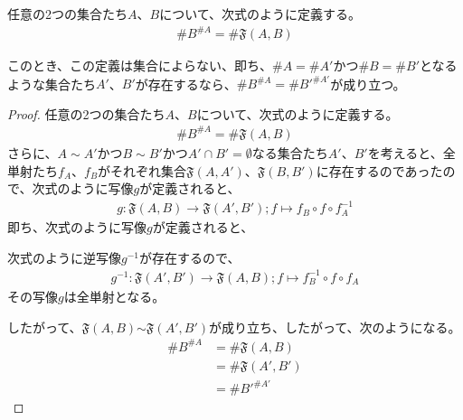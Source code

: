 \documentclass[dvipdfmx]{jsarticle}
\begin{document}
\begin{dfn}
任意の2つの集合たち$A$、$B$について、次式のように定義する。
\begin{align*}
{\# B}^{\# A} = \# {\mathfrak{F}(A,B)}
\end{align*}
\end{dfn}
\begin{thm}\label{1.2.8.7}
このとき、この定義は集合によらない、即ち、$\# A = \# A'$かつ$\# B = \# B'$となるような集合たち$A'$、$B'$が存在するなら、${\# B}^{\# A} = {\# B'}^{\# A'}$が成り立つ。
\end{thm}
\begin{proof} 任意の2つの集合たち$A$、$B$について、次式のように定義する。
\begin{align*}
{\# B}^{\# A} = \# {\mathfrak{F}(A,B)}
\end{align*}
さらに、$A \sim A'$かつ$B \sim B'$かつ$A' \cap B' = \emptyset $なる集合たち$A'$、$B'$を考えると、全単射たち$f_{A}$、$f_{B}$がそれぞれ集合$\mathfrak{F}\left( A,A' \right)$、$\mathfrak{F}\left( B,B' \right)$に存在するのであったので、次式のように写像$g$が定義されると、
\begin{align*}
g:\mathfrak{F}(A,B)\mathfrak{\rightarrow F}\left( A',B' \right);f \mapsto f_{B} \circ f \circ f_{A}^{- 1}
\end{align*}
即ち、次式のように写像$g$が定義されると、
\begin{center}
\end{center}
次式のように逆写像$g^{- 1}$が存在するので、
\begin{align*}
g^{- 1}\mathfrak{:F}\left( A',B' \right)\mathfrak{\rightarrow F}(A,B);f \mapsto f_{B}^{- 1} \circ f \circ f_{A}
\end{align*}
その写像$g$は全単射となる。\par
したがって、$\mathfrak{F}(A,B)\mathfrak{\sim F}\left( A',B' \right)$が成り立ち、したがって、次のようになる。
\begin{align*}
{\# B}^{\# A} &= \# {\mathfrak{F}(A,B)}\\
&= \# {\mathfrak{F}\left( A',B' \right)}\\
&= {\# B'}^{\# A'}
\end{align*}
\end{proof}
\end{document}

